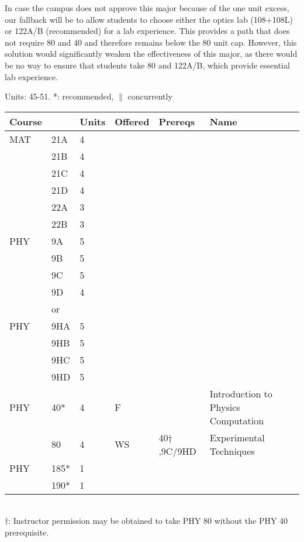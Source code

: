 \documentclass[12pt]{article}
\begin{document}
In case the campus does not approve this major because of the one unit
excess, our fallback will be to allow students to choose either the
optics lab (108+108L) or 122A/B (recommended) for a lab experience.
This provides a path that does not require 80 and 40 and therefore
remains below the 80 unit cap.  However, this solution would
significantly weaken the effectiveness of this major, as there would
be no way to ensure that students take 80 and 122A/B, which provide
essential lab experience.

\noindent
\vskip 0.25cm
Units:  45-51. *: recommended, $\parallel$ concurrently\\
\begin{tabular}{|llllll|}
\hline
Course & & Units & Offered & Prereqs & Name \\
\hline
MAT & 21A & 4 & &&\\
    & 21B & 4 & &&\\
    & 21C & 4 & &&\\
    & 21D & 4 & &&\\
    & 22A & 3 & &&\\
    & 22B & 3 & &&\\
\hline
\hline

PHY & 9A & 5 & &&\\
    & 9B & 5 & &&\\
    & 9C & 5 & &&\\
    & 9D & 4 & &&\\
\hline
&or&&\\
\hline
PHY & 9HA & 5 & &&\\
    & 9HB & 5 & &&\\
    & 9HC & 5 & &&\\
    & 9HD & 5 & &&\\
\hline
\hline
PHY & 40*  & 4 & F & & Introduction to Physics Computation \\ 
    & 80  & 4 & WS & 40$\dagger$,9C/9HD     & Experimental Techniques \\
PHY & 185* & 1 & &&\\
    & 190* & 1 & &&\\
\hline
\end{tabular}\\
$\dagger$:  Instructor permission may be obtained to take PHY 80 without the PHY 40 prerequisite.
\end{document}
